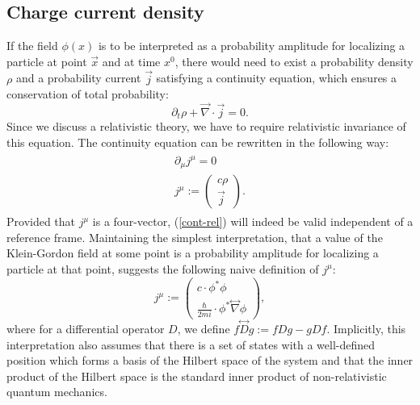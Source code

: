 \documentclass[11pt]{article}
\def\dvec#1{\overset{\leftrightarrow}{#1}}
\numberwithin{equation}{section}
\begin{document}
      \subsection{Charge current density}
      If the field $\phi(x)$ is to be interpreted as a probability amplitude for localizing a particle at point $\vec x$ and at time $x^0$,
      there would need to exist a probability density $\rho$ and a probability current $\vec j$ satisfying a continuity equation, which ensures a conservation of total probability:
      \begin{equation}
        \partial_t \rho + \vec\nabla \cdot \vec j = 0.
      \end{equation}
      Since we discuss a relativistic theory, we have to require relativistic invariance of this equation.
      The continuity equation can be rewritten in the following way:
      \begin{gather}
        \begin{gathered}
        \partial_\mu j^\mu = 0 \label{cont-rel} \\
        j^\mu := \begin{pmatrix}
          c \rho\\
          \vec j
        \end{pmatrix}.
    \end{gathered}
      \end{gather}
      Provided that $j^\mu$ is a four-vector, (\ref{cont-rel}) will indeed be valid independent of a reference frame.
      Maintaining the simplest interpretation, that a value of the Klein-Gordon field at some point is a probability amplitude for localizing a particle at that point,
      suggests the following naive definition of $j^\mu$:
      \begin{equation}
        j^\mu := \begin{pmatrix}
          c \cdot \phi^* \phi \\
          \frac{\hbar}{2 m i} \cdot \phi^* \dvec \nabla \phi \label{naive}
        \end{pmatrix},
      \end{equation}
      where for a differential operator $D$, we define $f \dvec D g := f D g - g D f$.
      Implicitly, this interpretation also assumes that there is a set of states with a well-defined position which forms a basis of the 
      Hilbert space of the system and that the inner product of the Hilbert space is the standard inner product of non-relativistic quantum mechanics. 
\end{document}
